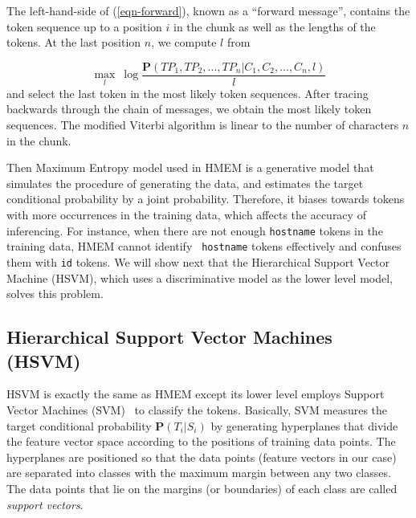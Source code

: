 The left-hand-side of (\ref{eqn-forward}), known as a ``forward message'',
contains the token sequence up to a position $i$ in the chunk as well as the lengths of
the tokens. 
At the last position $n$, we compute $l$ from 

\begin{equation}
\max_{l}~ \log \frac{\mathbf{P}(TP_1, TP_2, ...,
TP_n|C_1, C_2, ..., C_n,l)}{l}
\end{equation}
\noindent
and select the last token in the most likely token
sequences. After tracing backwards through the chain of messages,
we obtain the most likely token sequences. The modified Viterbi
algorithm is linear to the number of characters $n$ in the chunk.


Then Maximum Entropy model used in HMEM is a
generative model that simulates the procedure of generating the data, and
estimates the target conditional probability by a joint
probability. Therefore, it biases towards tokens with more
occurrences in the training data, which affects the accuracy of inferencing. 
For instance, when there are not enough
{\tt hostname} tokens in the training data, HMEM cannot identify {\tt
hostname} tokens effectively and confuses them with {\tt id}
tokens. We will show next that the Hierarchical
Support Vector Machine (HSVM), which uses a discriminative model as the
lower level model, solves this problem.

\subsection{Hierarchical Support Vector Machines (HSVM)}\label{subsec:hsvm}

HSVM is exactly the same as HMEM except its lower
level employs Support Vector Machines (SVM)~\cite{CC01a} to classify
the tokens. 
Basically, SVM measures the target conditional probability $\mathbf{P}(T_i|S_i)$ 
by generating hyperplanes that divide the feature vector space according to the
positions of training data points. The hyperplanes are positioned so that the
data points (feature vectors in our case) are separated into classes with
the maximum margin between any two classes. The data points that lie on
the margins (or boundaries) of each class are called {\em support vectors}. 


